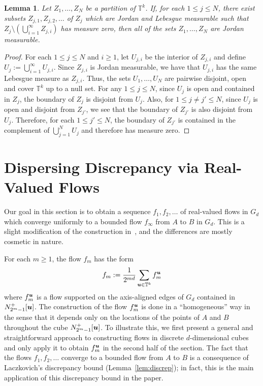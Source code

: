 \documentclass[12pt,a4paper]{amsart}
\numberwithin{equation}{section}
\newtheorem{lemma}[equation]{Lemma}
\theoremstyle{definition}
\begin{document}
\begin{lemma}
\label{lem:JordanLimit}
Let $Z_1,\dots,Z_N$ be a partition of $\mathbb{T}^k$. If, for each $1\leq j\leq N$, there exist subsets $Z_{j,1},Z_{j,2},\dots$ of $Z_j$ which are Jordan and Lebesgue measurable such that $Z_j\setminus\left(\bigcup_{i=1}^\infty Z_{j,i}\right)$ has measure zero, then all of the sets $Z_1,\dots,Z_N$ are Jordan measurable. 
\end{lemma}

\begin{proof}
For each $1\leq j\leq N$ and $i\geq1$, let $U_{j,i}$ be the interior of $Z_{j,i}$ and define $U_j:=\bigcup_{i=1}^\infty U_{j,i}$.  Since $Z_{j,i}$ is Jordan measurable, we have that $U_{j,i}$ has the same Lebesgue measure as $Z_{j,i}$. Thus, the sets $U_1,\dots,U_N$ are pairwise disjoint, open and cover $\mathbb{T}^k$ up to a null set. For any $1\leq j\leq N$, since $U_j$ is open and contained in $Z_j$, the boundary of $Z_j$ is disjoint from $U_j$. Also, for $1\leq j\neq j'\leq N$, since $U_j$ is open and disjoint from $Z_{j'}$, we see that the boundary of $Z_{j'}$ is also disjoint from $U_j$. Therefore, for each $1\leq j'\leq N$, the boundary of $Z_{j'}$ is contained in the complement of $\bigcup_{j=1}^NU_j$ and therefore has measure zero. 
\end{proof}



\section{Dispersing Discrepancy via Real-Valued Flows}
\label{sec:realFlows}

Our goal in this section is to obtain a sequence $f_1,f_2,\dots$ of real-valued flows in $G_d$ which converge uniformly to a bounded flow $f_\infty$ from $A$ to $B$ in $G_d$. This is a slight modification of the construction in~\cite[Section~4]{MarksUnger17}, and the differences are mostly cosmetic in nature. 

For each $m\geq1$, the flow $f_m$ has the form
\begin{equation}\label{eq:fm}f_m:=\frac{1}{2^{md}}\sum_{\boldsymbol{u}\in\mathbb{T}^k}f_m^{\boldsymbol{u}}\end{equation}
where $f_m^{\boldsymbol{u}}$ is a flow supported on the axis-aligned edges of $G_d$ contained in $N_{2^m-1}^+[\boldsymbol{u}]$. The construction of the flow $f_m^{\boldsymbol{u}}$ is done in a ``homogeneous'' way in the sense that it depends only on the locations of the points of $A$ and $B$ throughout the cube $N_{2^m-1}^+[\boldsymbol{u}]$. To illustrate this, we first present a general and straightforward approach to constructing flows in discrete $d$-dimensional cubes and only apply it to obtain $f_m^{\boldsymbol{u}}$ in the second half of the section. The fact that the flows $f_1,f_2,\dots$ converge to a bounded flow from $A$ to $B$ is a consequence of Laczkovich's discrepancy bound (Lemma~\ref{lem:discrep}); in fact, this is the main application of this discrepancy bound in the paper. 
\end{document}
